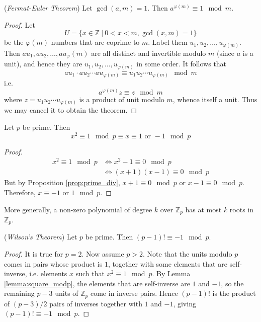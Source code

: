 \documentclass[10pt, a4paper, twoside]{report}
\begin{document}
\begin{theorem}
    (\emph{Fermat-Euler Theorem}) Let \(\gcd(a,m)=1\). Then \(a^{\varphi(m)}\equiv 1\mod m\).
    \label{thm:euler}
\end{theorem}
\begin{proof}
    Let 
    \[U=\{x\in\mathbb{Z}\:|\:0<x<m,\gcd(x,m)=1\}\]
    be the \(\varphi(m)\) numbers that are coprime to \(m\). Label them \(u_1,u_2,\ldots,u_{\varphi(m)}\). Then \(au_1,au_2,\ldots,au_\varphi(m)\) are all distinct and invertible modulo \(m\) (since \(a\) is a unit), and hence they are \(u_1,u_2,\ldots,u_{\varphi(m)}\) in some order. It follows that 
    \[au_1\cdot au_2\cdots au_{\varphi(m)}\equiv u_1u_2\cdots u_{\varphi(m)}\mod m\]
    i.e. 
    \[a^{\varphi(m)}z\equiv z\mod m\]
    where \(z=u_1u_2\cdots u_{\varphi(m)}\) is a product of unit modulo \(m\), whence itself a unit. Thus we may cancel it to obtain the theorem.
\end{proof}
\begin{lemma}
    Let \(p\) be prime. Then
    \[x^2\equiv 1\mod p\equiv x\equiv 1\text{  or  } -1\mod p\]
    \label{lemma:square_modp}
\end{lemma}
\begin{proof}
    \begin{align*}
        x^2\equiv 1\mod p &\Leftrightarrow x^2-1\equiv 0\mod p \\
        &\Leftrightarrow (x+1)(x-1)\equiv 0\mod p
    \end{align*}
    But by Proposition \ref{prop:prime_div}, \(x+1\equiv 0\mod p\) or \(x-1\equiv 0\mod p\). Therefore, \(x\equiv -1\text{  or  }1\mod p\).
\end{proof}
More generally, a non-zero polynomial of degree \(k\) over \(\mathbb{Z}_p\) has at most \(k\) roots in \(\mathbb{Z}_p\).
\begin{theorem}
    (\emph{Wilson's Theorem}) Let \(p\) be prime. Then \((p-1)!\equiv -1\mod p\).
    \label{thm:wilson}
\end{theorem}
\begin{proof}
    It is true for \(p=2\). Now assume \(p>2\). Note that the units modulo \(p\) comes in pairs whose product is \(1\), together with some elements that are self-inverse, i.e. elements \(x\) such that \(x^2\equiv 1\mod p\). By Lemma \ref{lemma:square_modp}, the elements that are self-inverse are \(1\) and \(-1\), so the remaining \(p-3\) units of \(\mathbb{Z}_p\) come in inverse pairs. Hence \((p-1)!\) is the product of \((p-3)/2\) pairs of inverses together with \(1\) and \(-1\), giving \((p-1)!\equiv -1\mod p\).
\end{proof}
\end{document}

